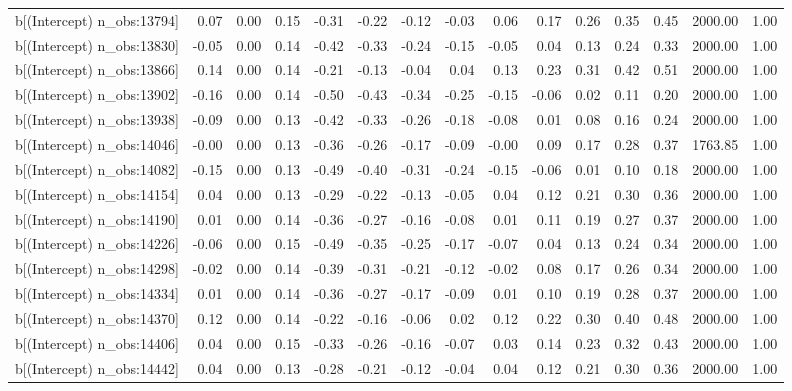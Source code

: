\begin{table}[ht]
\begin{tabular}{rrrrrrrrrrrrrrr}
  b[(Intercept) n\_obs:13794] & 0.07 & 0.00 & 0.15 & -0.31 & -0.22 & -0.12 & -0.03 & 0.06 & 0.17 & 0.26 & 0.35 & 0.45 & 2000.00 & 1.00 \\ 
  b[(Intercept) n\_obs:13830] & -0.05 & 0.00 & 0.14 & -0.42 & -0.33 & -0.24 & -0.15 & -0.05 & 0.04 & 0.13 & 0.24 & 0.33 & 2000.00 & 1.00 \\ 
  b[(Intercept) n\_obs:13866] & 0.14 & 0.00 & 0.14 & -0.21 & -0.13 & -0.04 & 0.04 & 0.13 & 0.23 & 0.31 & 0.42 & 0.51 & 2000.00 & 1.00 \\ 
  b[(Intercept) n\_obs:13902] & -0.16 & 0.00 & 0.14 & -0.50 & -0.43 & -0.34 & -0.25 & -0.15 & -0.06 & 0.02 & 0.11 & 0.20 & 2000.00 & 1.00 \\ 
  b[(Intercept) n\_obs:13938] & -0.09 & 0.00 & 0.13 & -0.42 & -0.33 & -0.26 & -0.18 & -0.08 & 0.01 & 0.08 & 0.16 & 0.24 & 2000.00 & 1.00 \\ 
  b[(Intercept) n\_obs:14046] & -0.00 & 0.00 & 0.13 & -0.36 & -0.26 & -0.17 & -0.09 & -0.00 & 0.09 & 0.17 & 0.28 & 0.37 & 1763.85 & 1.00 \\ 
  b[(Intercept) n\_obs:14082] & -0.15 & 0.00 & 0.13 & -0.49 & -0.40 & -0.31 & -0.24 & -0.15 & -0.06 & 0.01 & 0.10 & 0.18 & 2000.00 & 1.00 \\ 
  b[(Intercept) n\_obs:14154] & 0.04 & 0.00 & 0.13 & -0.29 & -0.22 & -0.13 & -0.05 & 0.04 & 0.12 & 0.21 & 0.30 & 0.36 & 2000.00 & 1.00 \\ 
  b[(Intercept) n\_obs:14190] & 0.01 & 0.00 & 0.14 & -0.36 & -0.27 & -0.16 & -0.08 & 0.01 & 0.11 & 0.19 & 0.27 & 0.37 & 2000.00 & 1.00 \\ 
  b[(Intercept) n\_obs:14226] & -0.06 & 0.00 & 0.15 & -0.49 & -0.35 & -0.25 & -0.17 & -0.07 & 0.04 & 0.13 & 0.24 & 0.34 & 2000.00 & 1.00 \\ 
  b[(Intercept) n\_obs:14298] & -0.02 & 0.00 & 0.14 & -0.39 & -0.31 & -0.21 & -0.12 & -0.02 & 0.08 & 0.17 & 0.26 & 0.34 & 2000.00 & 1.00 \\ 
  b[(Intercept) n\_obs:14334] & 0.01 & 0.00 & 0.14 & -0.36 & -0.27 & -0.17 & -0.09 & 0.01 & 0.10 & 0.19 & 0.28 & 0.37 & 2000.00 & 1.00 \\ 
  b[(Intercept) n\_obs:14370] & 0.12 & 0.00 & 0.14 & -0.22 & -0.16 & -0.06 & 0.02 & 0.12 & 0.22 & 0.30 & 0.40 & 0.48 & 2000.00 & 1.00 \\ 
  b[(Intercept) n\_obs:14406] & 0.04 & 0.00 & 0.15 & -0.33 & -0.26 & -0.16 & -0.07 & 0.03 & 0.14 & 0.23 & 0.32 & 0.43 & 2000.00 & 1.00 \\ 
  b[(Intercept) n\_obs:14442] & 0.04 & 0.00 & 0.13 & -0.28 & -0.21 & -0.12 & -0.04 & 0.04 & 0.12 & 0.21 & 0.30 & 0.36 & 2000.00 & 1.00 \\ 

\end{tabular}
\end{table}
